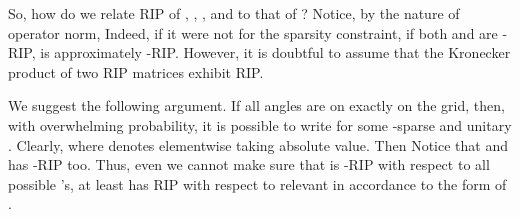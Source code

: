 \stopsubsection

\startsubsection [title={Confirming the Restricted Isometry}]

So, how do we relate RIP of , , , and  to that of ?
Notice, by the nature of operator norm,
Indeed, if it were not for the sparsity constraint, if both  and  are -RIP,  is approximately -RIP.
However, it is doubtful to assume that the Kronecker product of two RIP matrices exhibit RIP.

We suggest the following argument.
If all angles  are on exactly on the grid, then, with overwhelming probability, it is possible to write
for some -sparse  and unitary .
Clearly,
where  denotes elementwise taking absolute value.
Then
Notice that  and  has -RIP too.
Thus, even we cannot make sure that  is -RIP with respect to all possible 's, at least  has RIP with respect to relevant  in accordance to the form of .

\stopsubsection

\stopsection
